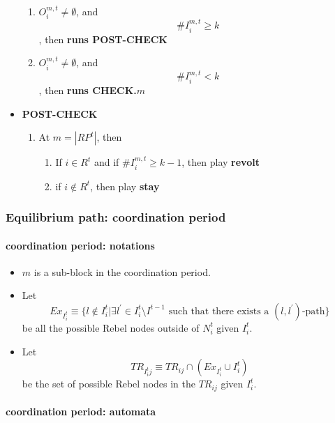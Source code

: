 \documentclass[12pt,letter]{article}
\theoremstyle{definition}
\theoremstyle{remark}
\theoremstyle{claim}
\begin{document}
\begin{itemize}
\begin{enumerate}
\item $O^{m,t}_i\neq \emptyset$, and
 \[\# I^{m,t}_i\geq k\]
, then 
\textbf{runs POST-CHECK }

\item $O^{m,t}_i\neq \emptyset$, and 
\[ \#I^{m,t}_i< k\]
, then \textbf{runs CHECK.$m$}
\end{enumerate}


\item \textbf{POST-CHECK}

\begin{enumerate}


\item At $m=|RP^t|$, then
\begin{enumerate}
\item If $i\in R^t$ and if $\# I^{m,t}_i\geq k-1$, then play
\textbf{revolt}

\item if $i\notin R^t$, then play
\textbf{stay}


\end{enumerate}
\end{enumerate}


\end{itemize}



\subsubsection{Equilibrium path: coordination period}
\paragraph{coordination period: notations}
\begin{itemize}
\item $m$ is a sub-block in the coordination period.
\item Let 
\[Ex_{I^{t}_i}\equiv \{l\notin I^{t}_i|\exists l^{'}\in I^{t}_i\setminus I^{t-1}\text{ such that there exists a $(l,l^{'})$-path}\}\]
be all the possible Rebel nodes outside of $N^{t}_i$ given $I^{t}_i$.

\item Let
\[TR_{I^{t}_ij}\equiv TR_{ij}\cap (Ex_{I^{t}_i}\cup I^{t}_i)\]
be the set of possible Rebel nodes in the $TR_{ij}$ given $I^{t}_i$. 

\end{itemize}




\paragraph{coordination period: automata}
\end{document}
